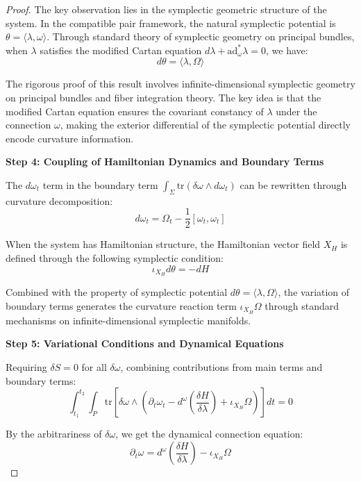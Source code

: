 \documentclass[a4paper,12pt]{extarticle}
\theoremstyle{definition}
\begin{document}
\begin{proof}
The key observation lies in the symplectic geometric structure of the system. In the compatible pair framework, the natural symplectic potential is $\theta = \langle\lambda, \omega\rangle$. Through standard theory of symplectic geometry on principal bundles, when $\lambda$ satisfies the modified Cartan equation $d\lambda + \text{ad}_\omega^* \lambda = 0$, we have:
$$d\theta = \langle\lambda, \Omega\rangle$$

The rigorous proof of this result involves infinite-dimensional symplectic geometry on principal bundles and fiber integration theory. The key idea is that the modified Cartan equation ensures the covariant constancy of $\lambda$ under the connection $\omega$, making the exterior differential of the symplectic potential directly encode curvature information.

\textbf{Step 4: Coupling of Hamiltonian Dynamics and Boundary Terms}

The $d\omega_t$ term in the boundary term $\int_\Sigma \text{tr}(\delta\omega \wedge d\omega_t)$ can be rewritten through curvature decomposition:
$$d\omega_t = \Omega_t - \frac{1}{2}[\omega_t, \omega_t]$$

When the system has Hamiltonian structure, the Hamiltonian vector field $X_H$ is defined through the following symplectic condition:
$$\iota_{X_H} d\theta = -dH$$

Combined with the property of symplectic potential $d\theta = \langle\lambda, \Omega\rangle$, the variation of boundary terms generates the curvature reaction term $\iota_{X_H}\Omega$ through standard mechanisms on infinite-dimensional symplectic manifolds.

\textbf{Step 5: Variational Conditions and Dynamical Equations}

Requiring $\delta S = 0$ for all $\delta\omega$, combining contributions from main terms and boundary terms:
$$\int_{t_1}^{t_2} \int_P \text{tr}\left[\delta\omega \wedge \left(\partial_t \omega_t - d^\omega\left(\frac{\delta H}{\delta \lambda}\right) + \iota_{X_H} \Omega\right)\right] dt = 0$$

By the arbitrariness of $\delta\omega$, we get the dynamical connection equation:
$$\partial_t \omega = d^\omega\left(\frac{\delta H}{\delta \lambda}\right) - \iota_{X_H} \Omega$$
\end{proof}
\end{document}
